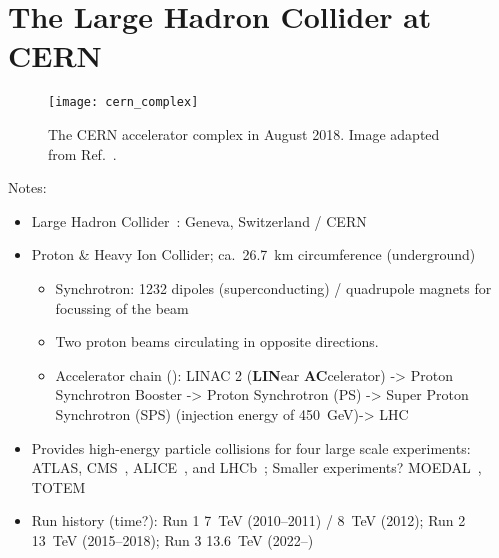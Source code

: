 \section{The Large Hadron Collider at CERN}

\begin{figure}[htbp]
  \centering

  \texttt{[image: cern\_complex]}

  \caption{The CERN accelerator complex in August 2018. Image adapted from
    Ref.~\cite{Mobs:2684277}.}%
  \label{fig:bla}
\end{figure}

Notes:
\begin{itemize}

\item Large Hadron Collider~\cite{Evans:2008zzb}: Geneva, Switzerland / CERN

\item Proton \& Heavy Ion Collider; ca.\ \SI{26.7}{\kilo\metre} circumference
  (underground)
  \begin{itemize}

  \item Synchrotron: 1232 dipoles (superconducting) / quadrupole magnets for
    focussing of the beam

  \item Two proton beams circulating in opposite directions.

  \item Accelerator chain (\pp): LINAC 2 (\textbf{LIN}ear \textbf{AC}celerator)
    -> Proton Synchrotron Booster -> Proton Synchrotron (PS) -> Super Proton
    Synchrotron (SPS) (injection energy of \SI{450}{\GeV})-> LHC



  \end{itemize}

\item Provides high-energy particle collisions for four large scale experiments:
  ATLAS, CMS~\cite{CMS-CMS-00-001}, ALICE~\cite{ALICE:2008ngc}, and
  LHCb~\cite{LHCb:2008vvz}; Smaller experiments?  MOEDAL~\cite{MoEDAL:2009jwa},
  TOTEM~\cite{TOTEM:2008lue}

\item Run history (time?): Run 1 \SI{7}{\TeV} (2010--2011) / \SI{8}{\TeV}
  (2012); Run 2 \SI{13}{\TeV} (2015--2018); Run 3 \SI{13.6}{\TeV} (2022--)


\end{itemize}
